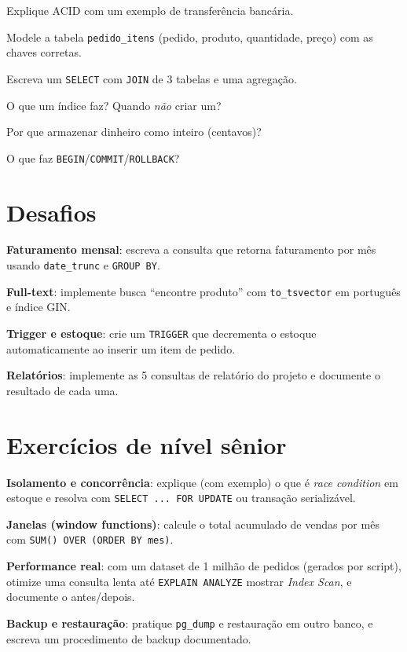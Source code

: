 \begin{exercicios}
  \item Explique ACID com um exemplo de transferência bancária.
  \item Modele a tabela \texttt{pedido\_itens} (pedido, produto, quantidade, preço) com as chaves corretas.
  \item Escreva um \texttt{SELECT} com \texttt{JOIN} de 3 tabelas e uma agregação.
  \item O que um índice faz? Quando \emph{não} criar um?
  \item Por que armazenar dinheiro como inteiro (centavos)?
  \item O que faz \texttt{BEGIN}/\texttt{COMMIT}/\texttt{ROLLBACK}?
\end{exercicios}

\section{Desafios}

\begin{desafios}
  \item \textbf{Faturamento mensal}: escreva a consulta que retorna faturamento por mês usando \texttt{date\_trunc} e \texttt{GROUP BY}.
  \item \textbf{Full-text}: implemente busca ``encontre produto'' com \texttt{to\_tsvector} em português e índice GIN.
  \item \textbf{Trigger e estoque}: crie um \texttt{TRIGGER} que decrementa o estoque automaticamente ao inserir um item de pedido.
  \item \textbf{Relatórios}: implemente as 5 consultas de relatório do projeto e documente o resultado de cada uma.
\end{desafios}

\section{Exercícios de nível sênior}

\begin{seniores}
  \item \textbf{Isolamento e concorrência}: explique (com exemplo) o que é \emph{race condition} em estoque e resolva com \texttt{SELECT ... FOR UPDATE} ou transação serializável.
  \item \textbf{Janelas (window functions)}: calcule o total acumulado de vendas por mês com \texttt{SUM() OVER (ORDER BY mes)}.
  \item \textbf{Performance real}: com um dataset de 1 milhão de pedidos (gerados por script), otimize uma consulta lenta até \texttt{EXPLAIN ANALYZE} mostrar \emph{Index Scan}, e documente o antes/depois.
  \item \textbf{Backup e restauração}: pratique \texttt{pg\_dump} e restauração em outro banco, e escreva um procedimento de backup documentado.
\end{seniores}

